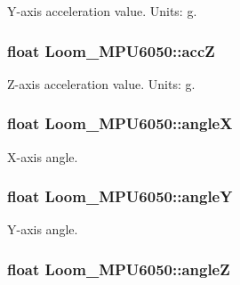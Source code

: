 Y-\/axis acceleration value. Units\+: g. 

\subsubsection[{\texorpdfstring{accZ}{accZ}}]{\setlength{\rightskip}{0pt plus 5cm}float Loom\+\_\+\+M\+P\+U6050\+::accZ\hspace{0.3cm}{\ttfamily [protected]}}\hypertarget{class_loom___m_p_u6050_a7d9d3324a3b3bf58f6a11993e8d28b61}{}\label{class_loom___m_p_u6050_a7d9d3324a3b3bf58f6a11993e8d28b61}


Z-\/axis acceleration value. Units\+: g. 

\subsubsection[{\texorpdfstring{angleX}{angleX}}]{\setlength{\rightskip}{0pt plus 5cm}float Loom\+\_\+\+M\+P\+U6050\+::angleX\hspace{0.3cm}{\ttfamily [protected]}}\hypertarget{class_loom___m_p_u6050_a3f223a2721a44ff4d49a6194189a55c4}{}\label{class_loom___m_p_u6050_a3f223a2721a44ff4d49a6194189a55c4}


X-\/axis angle. 

\subsubsection[{\texorpdfstring{angleY}{angleY}}]{\setlength{\rightskip}{0pt plus 5cm}float Loom\+\_\+\+M\+P\+U6050\+::angleY\hspace{0.3cm}{\ttfamily [protected]}}\hypertarget{class_loom___m_p_u6050_acccd878ef904048c3e770011f2f36a1c}{}\label{class_loom___m_p_u6050_acccd878ef904048c3e770011f2f36a1c}


Y-\/axis angle. 

\subsubsection[{\texorpdfstring{angleZ}{angleZ}}]{\setlength{\rightskip}{0pt plus 5cm}float Loom\+\_\+\+M\+P\+U6050\+::angleZ\hspace{0.3cm}{\ttfamily [protected]}}\hypertarget{class_loom___m_p_u6050_a8d8c30186abcda908795de978a5f6cd3}{}\label{class_loom___m_p_u6050_a8d8c30186abcda908795de978a5f6cd3}


